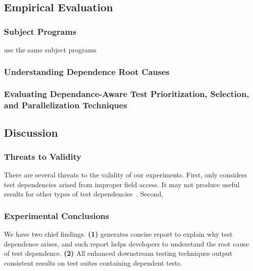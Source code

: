 \subsection{Empirical Evaluation}
\label{sec:evaluation}

\subsubsection{Subject Programs}

use the same subject programs

\subsubsection{Understanding Dependence Root Causes}

\subsubsection{Evaluating Dependance-Aware Test Prioritization, Selection, and Parallelization Techniques}

\subsection{Discussion}

\subsubsection{Threats to Validity}

There are several threats to the validity
of our experiments. First, \dtexplain 
only considers test dependencies arised
from improper field access. It may not
produce useful results for other types of
test dependencies~\cite{}. Second,

\subsubsection{Experimental Conclusions}

We have two chief findings. \textbf{(1)} \dtexplain
generates concise report to explain why
test dependence arises, and such report
helps developers to understand the root cause
of test dependence. \textbf{(2)} All
enhanced downstream testing techniques
output consistent results on test suites
containing dependent tests.
